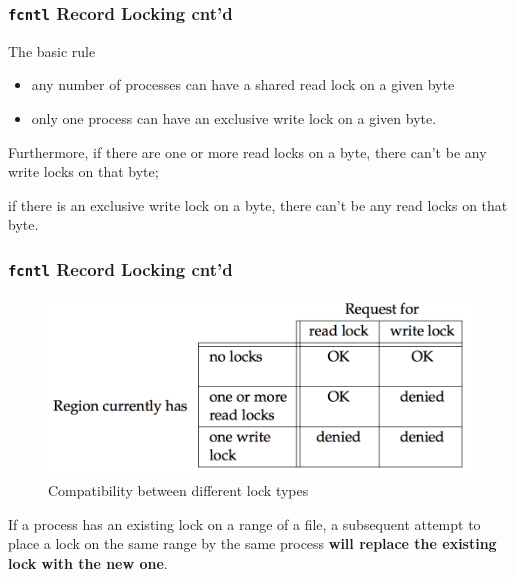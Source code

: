 \documentclass[newPxFont,sthlmFooter,nooffset]{beamer}
\begin{document}
\begin{frame}[t]
  \frametitle{\texttt{fcntl} Record Locking cnt'd}
The basic rule
\begin{itemize}
\item any number of processes can have a shared read lock on a given
  byte
\item only one process can have an exclusive write lock on a
  given byte.
\end{itemize}

\bigskip
Furthermore, if there are one or more read locks on a byte, there can’t be any write locks on that byte;

\bigskip
if there is an exclusive write lock on a byte, there can’t be any read locks on that byte.
\end{frame}

\begin{frame}[t]
  \frametitle{\texttt{fcntl} Record Locking cnt'd}

  \begin{figure}[h]
   \centering
    \includegraphics[width=0.7\linewidth]{figures/fig14_3-compatibility.png}
    \caption{Compatibility between different lock types}
  \end{figure}

\bigskip

If a process has an existing lock on a range of a file, a subsequent attempt to place a lock on the same range by the same process \textbf{will replace the existing lock with the new one}.
\end{frame}
\end{document}
